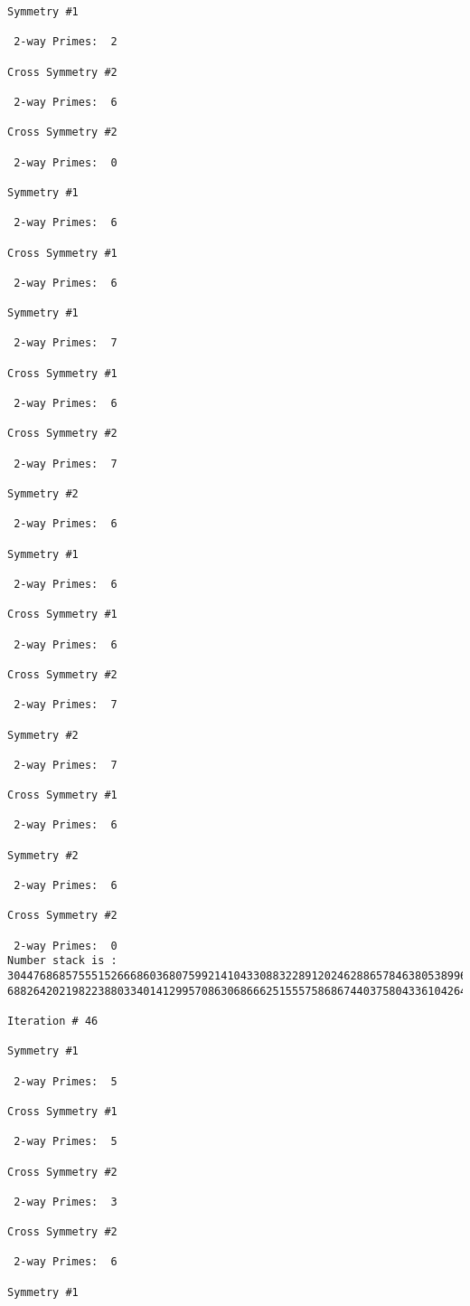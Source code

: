 {{{{\begin{verbatim}
Symmetry #1

 2-way Primes: 	2

Cross Symmetry #2

 2-way Primes: 	6

Cross Symmetry #2

 2-way Primes: 	0

Symmetry #1

 2-way Primes: 	6

Cross Symmetry #1

 2-way Primes: 	6

Symmetry #1

 2-way Primes: 	7

Cross Symmetry #1

 2-way Primes: 	6

Cross Symmetry #2

 2-way Primes: 	7

Symmetry #2

 2-way Primes: 	6

Symmetry #1

 2-way Primes: 	6

Cross Symmetry #1

 2-way Primes: 	6

Cross Symmetry #2

 2-way Primes: 	7

Symmetry #2

 2-way Primes: 	7

Cross Symmetry #1

 2-way Primes: 	6

Symmetry #2

 2-way Primes: 	6

Cross Symmetry #2

 2-way Primes: 	0
Number stack is :
30447686857555152666860368075992141043308832289120246288657846380538996794608835958544046240163340857
68826420219822388033401412995708630686662515557586867440375804336104264044585953880649769983508364875

Iteration #	46

Symmetry #1

 2-way Primes: 	5

Cross Symmetry #1

 2-way Primes: 	5

Cross Symmetry #2

 2-way Primes: 	3

Cross Symmetry #2

 2-way Primes: 	6

Symmetry #1


\end{verbatim}}}}}
